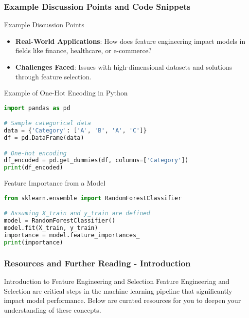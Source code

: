 \documentclass[aspectratio=169]{beamer}
\begin{document}
\begin{frame}[fragile]
    \frametitle{Example Discussion Points and Code Snippets}
    \begin{block}{Example Discussion Points}
        \begin{itemize}
            \item \textbf{Real-World Applications}: How does feature engineering impact models in fields like finance, healthcare, or e-commerce?
            \item \textbf{Challenges Faced}: Issues with high-dimensional datasets and solutions through feature selection.
        \end{itemize}
    \end{block}

    \begin{block}{Example of One-Hot Encoding in Python}
    \begin{lstlisting}[language=Python]
import pandas as pd

# Sample categorical data
data = {'Category': ['A', 'B', 'A', 'C']}
df = pd.DataFrame(data)

# One-hot encoding
df_encoded = pd.get_dummies(df, columns=['Category'])
print(df_encoded)
    \end{lstlisting}
    \end{block}

    \begin{block}{Feature Importance from a Model}
    \begin{lstlisting}[language=Python]
from sklearn.ensemble import RandomForestClassifier

# Assuming X_train and y_train are defined
model = RandomForestClassifier()
model.fit(X_train, y_train)
importance = model.feature_importances_
print(importance)
    \end{lstlisting}
    \end{block}
\end{frame}

\begin{frame}[fragile]
    \frametitle{Resources and Further Reading - Introduction}
    \begin{block}{Introduction to Feature Engineering and Selection}
        Feature Engineering and Selection are critical steps in the machine learning pipeline that significantly impact model performance. Below are curated resources for you to deepen your understanding of these concepts.
    \end{block}
\end{frame}
\end{document}
